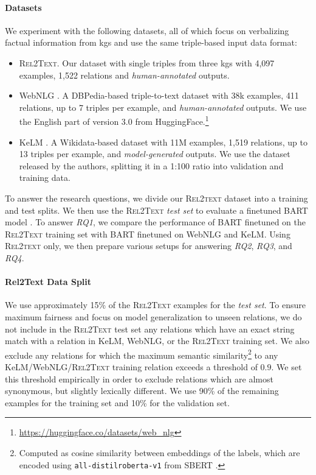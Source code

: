 \paragraph*{Datasets}  We experiment with the following datasets, all of which focus on verbalizing factual information from \acp{kg} and use the same triple-based input data format:
\begin{itemize}
    \item \textsc{Rel2Text}. Our dataset with single triples from three \acp{kg} with 4,097 examples, 1,522 relations and \textit{human-annotated} outputs.
    \item WebNLG \cite{ferreira20202020,gardentWebNLGChallengeGenerating2017}. A DBPedia-based triple-to-text dataset with 38k examples, 411 relations, up to 7 triples per example, and \textit{human-annotated} outputs. We use the English part of version 3.0 from HuggingFace.\footnote{\url{https://huggingface.co/datasets/web_nlg}}
    \item KeLM \cite{agarwalKnowledgeGraphBased2021}. A Wikidata-based dataset with 11M examples, 1,519 relations, up to 13 triples per example, and \textit{model-generated} outputs. We use the dataset released by the authors, splitting it in a 1:100 ratio into validation and training data.
\end{itemize}
To answer the research questions, we divide our \textsc{Rel2text} dataset into a training and test splits. We then use the \textsc{Rel2Text} \emph{test set} to evaluate a finetuned BART model \cite{lewisBARTDenoisingSequencetoSequence2019}. To answer \emph{RQ1}, we compare the performance of BART finetuned on the \textsc{Rel2Text} training set with BART finetuned on WebNLG and KeLM. Using \textsc{Rel2text} only, we then prepare various setups for answering \emph{RQ2}, \emph{RQ3}, and \emph{RQ4}.


\paragraph{Rel2Text Data Split} We use approximately 15\% of the \textsc{Rel2Text} examples for the \emph{test set}. To ensure maximum fairness and focus on model generalization to unseen relations, we do not include in the \textsc{Rel2Text} test set any relations which have an exact string match with a relation in KeLM, WebNLG, or the \textsc{Rel2Text} training set. We also exclude any relations for which the maximum semantic similarity\footnote{Computed as cosine similarity between embeddings of the labels, which are encoded using \texttt{all-distilroberta-v1} from SBERT \cite{reimers-gurevych-2019-sentence}.} to any KeLM/WebNLG/\textsc{Rel2Text} training relation exceeds a threshold of $0.9$. We set this threshold empirically in order to exclude relations which are almost synonymous, but slightly lexically different.
We use 90\% of the remaining examples for the training set and 10\% for the validation set.

